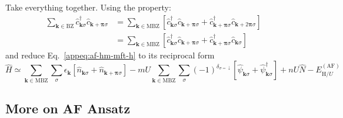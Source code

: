 Take everything together. Using the property:
\begin{align}
	\sum_{\mathbf{k} \in \mathrm{BZ}}
	\hat c_{\mathbf{k}\sigma}^\dagger \hat c_{\mathbf{k}+\bm{\pi}\sigma} &= \sum_{\mathbf{k} \in \mathrm{MBZ}}
	\left[
		\hat c_{\mathbf{k}\sigma}^\dagger \hat c_{\mathbf{k}+\bm{\pi}\sigma} + \hat c_{\mathbf{k}+\bm{\pi}\sigma}^\dagger \hat c_{\mathbf{k}+2\bm{\pi}\sigma}
	\right] \nonumber \\
	&= \sum_{\mathbf{k} \in \mathrm{MBZ}}
	\left[
		\hat c_{\mathbf{k}\sigma}^\dagger \hat c_{\mathbf{k}+\bm{\pi}\sigma} + \hat c_{\mathbf{k}+\bm{\pi}\sigma}^\dagger \hat c_{\mathbf{k}\sigma}
	\right] \label{appeq:mixed-cc-term-intermediate-passage}
\end{align}
and reduce Eq.~\eqref{appeq:af-hm-mft-h} to its reciprocal form
\[
	\hat H \simeq \sum_{\mathbf{k}\in\mathrm{MBZ}} \sum_\sigma \epsilon_\mathbf{k} \left[
		\hat n_{\mathbf{k}\sigma} + \hat n_{\mathbf{k}+\bm{\pi}\sigma}
	\right] - mU \sum_{\mathbf{k}\in\mathrm{MBZ}} \sum_\sigma (-1)^{\delta_{\sigma=\downarrow}} \left[
		\hat \psi_{\mathbf{k}\sigma} + \hat \psi_{\mathbf{k}\sigma}^\dagger
	\right] + nU \hat N - E_{\mathrm{H}/U}^{(\mathrm{AF})}
\]

\subsection{More on AF Ansatz}\label{appsubsec:af-more}

